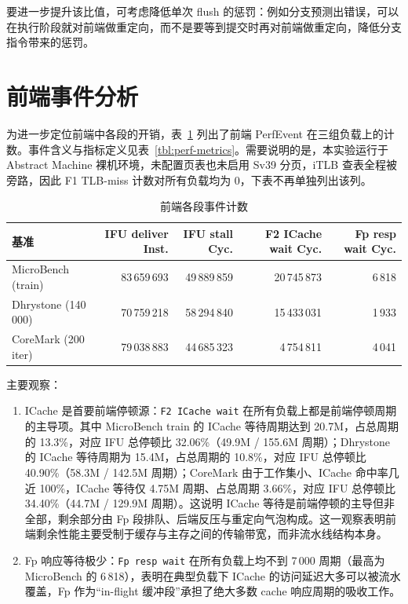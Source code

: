 要进一步提升该比值，可考虑降低单次 flush 的惩罚：例如分支预测出错误，可以在执行阶段就对前端做重定向，而不是要等到提交时再对前端做重定向，降低分支指令带来的惩罚。

\section{前端事件分析}\label{sec:perf-fe-breakdown}

为进一步定位前端中各段的开销，表~\ref{tbl:perf-fe-events} 列出了前端 PerfEvent 在三组负载上的计数。事件含义与指标定义见表~\ref{tbl:perf-metrics}。需要说明的是，本实验运行于 Abstract Machine 裸机环境，未配置页表也未启用 Sv39 分页，iTLB 查表全程被旁路，因此 F1 TLB-miss 计数对所有负载均为 0，下表不再单独列出该列。

\begin{table}[H]
  \centering
  \caption{前端各段事件计数}
  \label{tbl:perf-fe-events}
  \begin{tabular}{lrrrr}
    \toprule
    基准 & IFU deliver Inst. & IFU stall Cyc. & F2 ICache wait Cyc. & Fp resp wait Cyc. \\
    \midrule
    MicroBench (train) & 83\,659\,693 & 49\,889\,859 & 20\,745\,873 & 6\,818 \\
    Dhrystone (140 000) & 70\,759\,218 & 58\,294\,840 & 15\,433\,031 & 1\,933 \\
    CoreMark (200 iter) & 79\,038\,883 & 44\,685\,323 & 4\,754\,811 & 4\,041 \\
    \bottomrule
  \end{tabular}
\end{table}

主要观察：

\begin{enumerate}
  \item ICache 是首要前端停顿源：\lstinline|F2 ICache wait| 在所有负载上都是前端停顿周期的主导项。其中 MicroBench train 的 ICache 等待周期达到 20.7M，占总周期的 13.3\%，对应 IFU 总停顿比 32.06\%（49.9M / 155.6M 周期）；Dhrystone 的 ICache 等待周期为 15.4M，占总周期的 10.8\%，对应 IFU 总停顿比 40.90\%（58.3M / 142.5M 周期）；CoreMark 由于工作集小、ICache 命中率几近 100\%，ICache 等待仅 4.75M 周期、占总周期 3.66\%，对应 IFU 总停顿比 34.40\%（44.7M / 129.9M 周期）。这说明 ICache 等待是前端停顿的主导但非全部，剩余部分由 Fp 段排队、后端反压与重定向气泡构成。这一观察表明前端剩余性能主要受制于缓存与主存之间的传输带宽，而非流水线结构本身。
  \item Fp 响应等待极少：\lstinline|Fp resp wait| 在所有负载上均不到 7\,000 周期（最高为 MicroBench 的 6\,818），表明在典型负载下 ICache 的访问延迟大多可以被流水覆盖，Fp 作为“in-flight 缓冲段”承担了绝大多数 cache 响应周期的吸收工作。
\end{enumerate}

